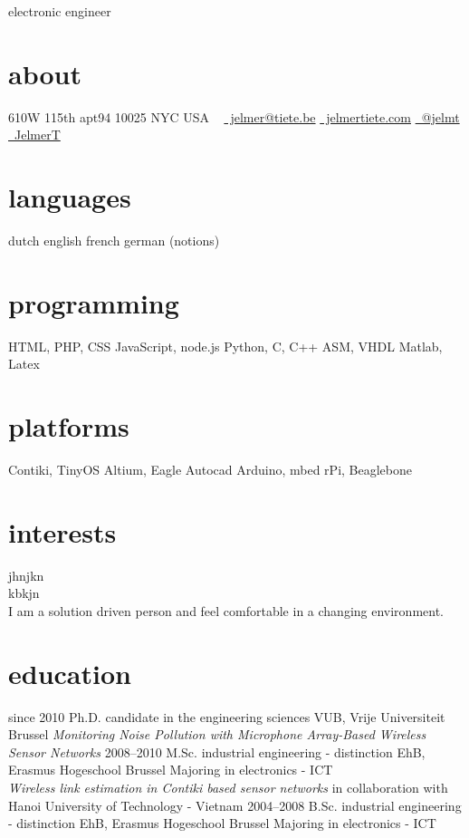 \documentclass[print]{friggeri-cv}
\begin{document}
       {electronic engineer}


\begin{aside}
  \section{about}
    610W 115th apt94
    10025 NYC
    USA
    ~
    \href{mailto:jelmer@tiete.be}{\faEnvelopeAlt~jelmer@tiete.be}
    \href{http://jelmertiete.com}{\faGlobe~jelmertiete.com}
    \href{http://twitter.com/jelmt}{\faTwitter~@jelmt}
    \href{https://github.com/JelmerT}{\faGithub~JelmerT}
  \section{languages}
    dutch
    english
    french
    german (notions)
  \section{programming}
    HTML, PHP, CSS
    JavaScript, node.js
    Python, C, C++
    ASM, VHDL
    Matlab, Latex
  \section{platforms}
    Contiki, TinyOS
    Altium, Eagle
    Autocad
    Arduino, mbed
    rPi, Beaglebone
\end{aside}

\section{interests}
jhnjkn\\
kbkjn \\
I am a solution driven person and feel comfortable in a changing environment.

\section{education}

\begin{entrylist}
  \entry
    {since 2010}
    {Ph.D. {\normalfont candidate in the engineering sciences}}
    {VUB, Vrije Universiteit Brussel}
    {\emph{Monitoring Noise Pollution with Microphone Array-Based Wireless Sensor Networks}}
  \entry
    {2008–2010}
    {M.Sc. {\normalfont industrial engineering - distinction}}
    {EhB, Erasmus Hogeschool Brussel}
    {Majoring in electronics - ICT\\
    \emph{Wireless link estimation in Contiki based sensor networks} in collaboration with Hanoi University of Technology - Vietnam}
  \entry
    {2004–2008}
    {B.Sc. {\normalfont industrial engineering - distinction}}
    {EhB, Erasmus Hogeschool Brussel}
    {Majoring in electronics - ICT}
\end{entrylist}
\end{document}
